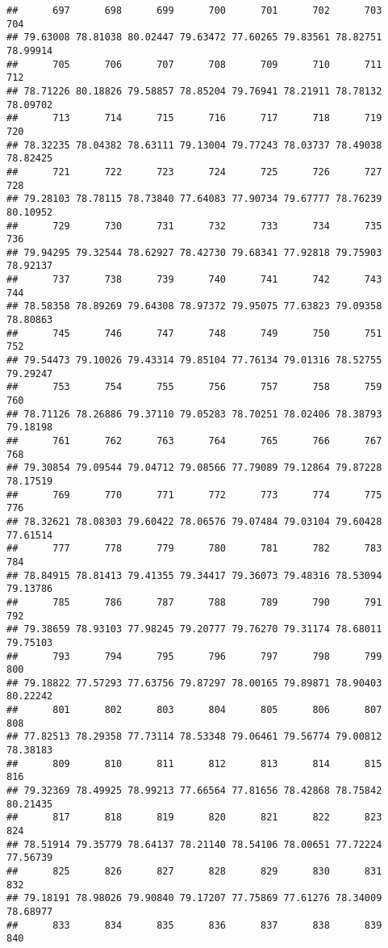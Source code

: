 \documentclass[
]{article}
\begin{document}
\begin{verbatim}
##      697      698      699      700      701      702      703      704 
## 79.63008 78.81038 80.02447 79.63472 77.60265 79.83561 78.82751 78.99914 
##      705      706      707      708      709      710      711      712 
## 78.71226 80.18826 79.58857 78.85204 79.76941 78.21911 78.78132 78.09702 
##      713      714      715      716      717      718      719      720 
## 78.32235 78.04382 78.63111 79.13004 79.77243 78.03737 78.49038 78.82425 
##      721      722      723      724      725      726      727      728 
## 79.28103 78.78115 78.73840 77.64083 77.90734 79.67777 78.76239 80.10952 
##      729      730      731      732      733      734      735      736 
## 79.94295 79.32544 78.62927 78.42730 79.68341 77.92818 79.75903 78.92137 
##      737      738      739      740      741      742      743      744 
## 78.58358 78.89269 79.64308 78.97372 79.95075 77.63823 79.09358 78.80863 
##      745      746      747      748      749      750      751      752 
## 79.54473 79.10026 79.43314 79.85104 77.76134 79.01316 78.52755 79.29247 
##      753      754      755      756      757      758      759      760 
## 78.71126 78.26886 79.37110 79.05283 78.70251 78.02406 78.38793 79.18198 
##      761      762      763      764      765      766      767      768 
## 79.30854 79.09544 79.04712 79.08566 77.79089 79.12864 79.87228 78.17519 
##      769      770      771      772      773      774      775      776 
## 78.32621 78.08303 79.60422 78.06576 79.07484 79.03104 79.60428 77.61514 
##      777      778      779      780      781      782      783      784 
## 78.84915 78.81413 79.41355 79.34417 79.36073 79.48316 78.53094 79.13786 
##      785      786      787      788      789      790      791      792 
## 79.38659 78.93103 77.98245 79.20777 79.76270 79.31174 78.68011 79.75103 
##      793      794      795      796      797      798      799      800 
## 79.18822 77.57293 77.63756 79.87297 78.00165 79.89871 78.90403 80.22242 
##      801      802      803      804      805      806      807      808 
## 77.82513 78.29358 77.73114 78.53348 79.06461 79.56774 79.00812 78.38183 
##      809      810      811      812      813      814      815      816 
## 79.32369 78.49925 78.99213 77.66564 77.81656 78.42868 78.75842 80.21435 
##      817      818      819      820      821      822      823      824 
## 78.51914 79.35779 78.64137 78.21140 78.54106 78.00651 77.72224 77.56739 
##      825      826      827      828      829      830      831      832 
## 79.18191 78.98026 79.90840 79.17207 77.75869 77.61276 78.34009 78.68977 
##      833      834      835      836      837      838      839      840 

\end{verbatim}
\end{document}
